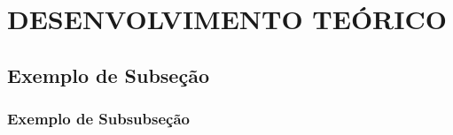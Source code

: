 \section{DESENVOLVIMENTO TEÓRICO}

\subsection{Exemplo de Subseção}



\subsubsection{Exemplo de Subsubseção}

